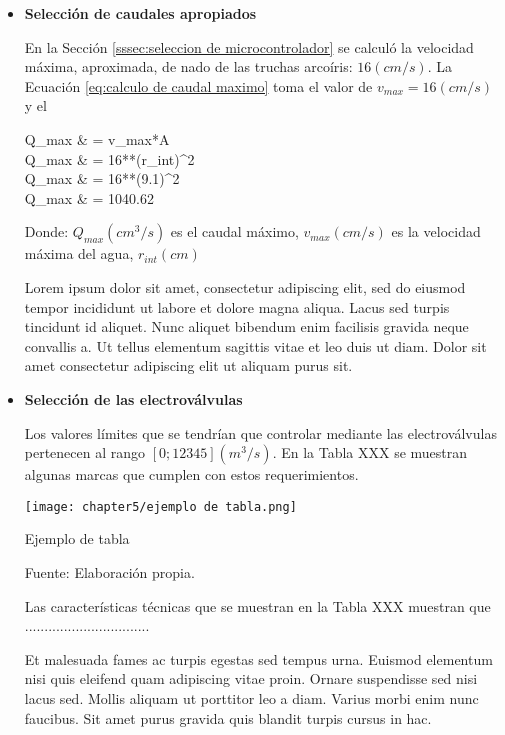 \begin{itemize}
	\item \textbf{Selección de caudales apropiados} 

	En la Sección \ref{sssec:seleccion de microcontrolador} se calculó la velocidad máxima, aproximada, de nado de las truchas arcoíris: $16 (cm/s)$. La Ecuación \ref{eq:calculo de caudal maximo} toma el valor de \textit{$v_{max}=16 (cm/s)$}  y el 
	
	\begin{myequation}\label{eq:calculo de caudal maximo}
		\begin{split}
			Q_{max} & = v_{max}*A \\
			Q_{max} & = 16**(r_{int})^2 \\
			Q_{max} & = 16**(9.1)^2 \\
			Q_{max} & = 1040.62 \\
		\end{split}		
	\end{myequation}
	Donde: $Q_{max} (cm^3/s)$ es el caudal máximo, $v_{max} (cm/s)$ es la velocidad máxima del agua, $r_{int} (cm)$
	
	Lorem ipsum dolor sit amet, consectetur adipiscing elit, sed do eiusmod tempor incididunt ut labore et dolore magna aliqua. Lacus sed turpis tincidunt id aliquet. Nunc aliquet bibendum enim facilisis gravida neque convallis a. Ut tellus elementum sagittis vitae et leo duis ut diam. Dolor sit amet consectetur adipiscing elit ut aliquam purus sit.	

	
	\item \textbf{Selección de las electroválvulas}
	
	Los valores límites que se tendrían que controlar mediante las electroválvulas pertenecen al rango $[0;12345] (m^3/s)$. En la Tabla XXX se muestran algunas marcas que cumplen con estos requerimientos.
	
	
	\begin{myfigure}[H]
		\centering
		\texttt{[image: chapter5/ejemplo de tabla.png]}
		\caption{Ejemplo de tabla}
		\begin{myflushleftportland}
			Fuente: Elaboración propia.
		\end{myflushleftportland}
		\label{fig:ejemplo de tabla}
	\end{myfigure}
	
	Las características técnicas que se muestran en la Tabla XXX muestran que ................................
	
	Et malesuada fames ac turpis egestas sed tempus urna. Euismod elementum nisi quis eleifend quam adipiscing vitae proin. Ornare suspendisse sed nisi lacus sed. Mollis aliquam ut porttitor leo a diam. Varius morbi enim nunc faucibus. Sit amet purus gravida quis blandit turpis cursus in hac.
	

\end{itemize}
